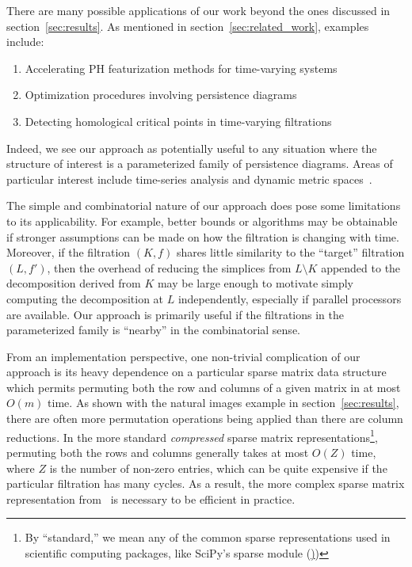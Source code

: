 \documentclass[sn-mathphys]{sn-jnl}
\begin{document}
There are many possible applications of our work beyond the ones discussed in section~\ref{sec:results}. As mentioned in section~\ref{sec:related_work}, examples include: 
\begin{enumerate}
	\item Accelerating PH featurization methods for time-varying systems 
	\item Optimization procedures involving persistence diagrams
	\item Detecting homological critical points in time-varying filtrations
\end{enumerate}
Indeed, we see our approach as potentially useful to any situation where the structure of interest is a parameterized family of persistence diagrams. Areas of particular interest include time-series analysis and dynamic metric spaces~\cite{kim2020spatiotemporal}. 

The simple and combinatorial nature of our approach does pose some limitations to its applicability. For example, better bounds or algorithms may be obtainable if stronger assumptions can be made on how the filtration is changing with time. Moreover, if the filtration $(K, f)$ shares little similarity to the ``target'' filtration $(L,f')$, then the overhead of reducing the simplices from $L \setminus K$ appended to the decomposition derived from $K$ may be large enough to motivate simply computing the decomposition at $L$ independently, especially if parallel processors are available. 
Our approach is primarily useful if the filtrations in the parameterized family is ``nearby'' in the combinatorial sense. 

From an implementation perspective, one non-trivial complication of our approach is its heavy dependence on a particular sparse matrix data structure which permits permuting both the row and columns of a given matrix in at most $O(m)$ time. As shown with the natural images example in section~\ref{sec:results}, there are often more permutation operations being applied than there are column reductions. In the more standard \emph{compressed} sparse matrix representations\footnote{
By ``standard,'' we mean any of the common sparse representations used in scientific computing packages, like SciPy's sparse module (\href{https://docs.scipy.org/doc/scipy/reference/sparse.html} 
))
}, permuting both the rows and columns generally takes at most $O(Z)$ time, where $Z$ is the number of non-zero entries, which can be quite expensive if the particular filtration has many cycles. As a result, the more complex sparse matrix representation from~\cite{cohen2006vines} is necessary to be efficient in practice. 
\end{document}
